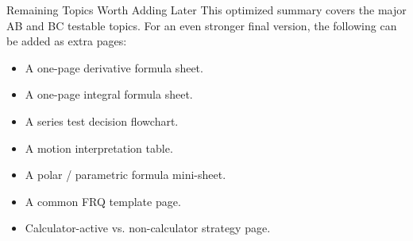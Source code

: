 \documentclass[11pt]{article}
\begin{document}
\begin{warningbox}{Remaining Topics Worth Adding Later}
This optimized summary covers the major AB and BC testable topics.  
For an even stronger final version, the following can be added as extra pages:

\begin{itemize}[leftmargin=1.5em]
\item A one-page derivative formula sheet.
\item A one-page integral formula sheet.
\item A series test decision flowchart.
\item A motion interpretation table.
\item A polar / parametric formula mini-sheet.
\item A common FRQ template page.
\item Calculator-active vs. non-calculator strategy page.
\end{itemize}
\end{warningbox}
\end{document}
